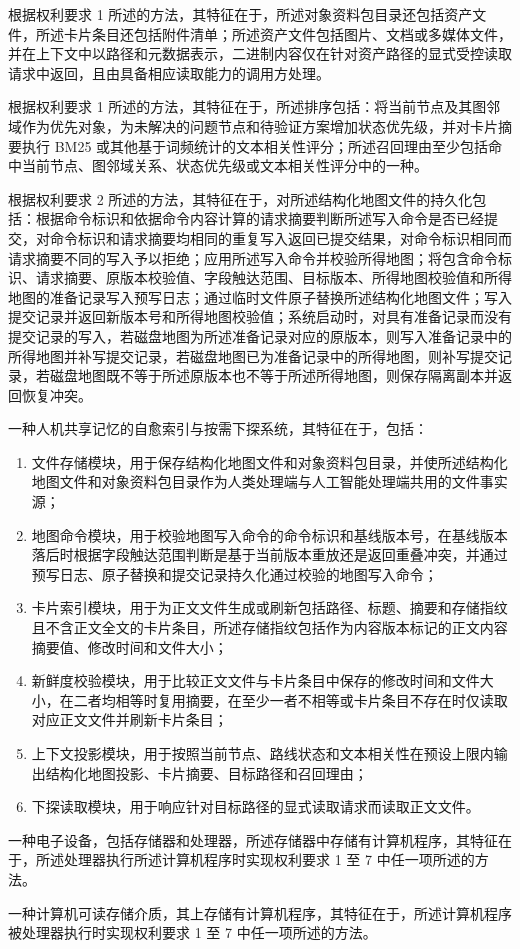 \begin{claimitem}
\item 根据权利要求 1 所述的方法，其特征在于，所述对象资料包目录还包括资产文件，所述卡片条目还包括附件清单；所述资产文件包括图片、文档或多媒体文件，并在上下文中以路径和元数据表示，二进制内容仅在针对资产路径的显式受控读取请求中返回，且由具备相应读取能力的调用方处理。

\item 根据权利要求 1 所述的方法，其特征在于，所述排序包括：将当前节点及其图邻域作为优先对象，为未解决的问题节点和待验证方案增加状态优先级，并对卡片摘要执行 BM25 或其他基于词频统计的文本相关性评分；所述召回理由至少包括命中当前节点、图邻域关系、状态优先级或文本相关性评分中的一种。

\item 根据权利要求 2 所述的方法，其特征在于，对所述结构化地图文件的持久化包括：根据命令标识和依据命令内容计算的请求摘要判断所述写入命令是否已经提交，对命令标识和请求摘要均相同的重复写入返回已提交结果，对命令标识相同而请求摘要不同的写入予以拒绝；应用所述写入命令并校验所得地图；将包含命令标识、请求摘要、原版本校验值、字段触达范围、目标版本、所得地图校验值和所得地图的准备记录写入预写日志；通过临时文件原子替换所述结构化地图文件；写入提交记录并返回新版本号和所得地图校验值；系统启动时，对具有准备记录而没有提交记录的写入，若磁盘地图为所述准备记录对应的原版本，则写入准备记录中的所得地图并补写提交记录，若磁盘地图已为准备记录中的所得地图，则补写提交记录，若磁盘地图既不等于所述原版本也不等于所述所得地图，则保存隔离副本并返回恢复冲突。

\item 一种人机共享记忆的自愈索引与按需下探系统，其特征在于，包括：
\begin{enumerate}[label=(\arabic*),leftmargin=2.6em,itemsep=0.65em,topsep=0.55em]
\item 文件存储模块，用于保存结构化地图文件和对象资料包目录，并使所述结构化地图文件和对象资料包目录作为人类处理端与人工智能处理端共用的文件事实源；
\item 地图命令模块，用于校验地图写入命令的命令标识和基线版本号，在基线版本落后时根据字段触达范围判断是基于当前版本重放还是返回重叠冲突，并通过预写日志、原子替换和提交记录持久化通过校验的地图写入命令；
\item 卡片索引模块，用于为正文文件生成或刷新包括路径、标题、摘要和存储指纹且不含正文全文的卡片条目，所述存储指纹包括作为内容版本标记的正文内容摘要值、修改时间和文件大小；
\item 新鲜度校验模块，用于比较正文文件与卡片条目中保存的修改时间和文件大小，在二者均相等时复用摘要，在至少一者不相等或卡片条目不存在时仅读取对应正文文件并刷新卡片条目；
\item 上下文投影模块，用于按照当前节点、路线状态和文本相关性在预设上限内输出结构化地图投影、卡片摘要、目标路径和召回理由；
\item 下探读取模块，用于响应针对目标路径的显式读取请求而读取正文文件。
\end{enumerate}

\item 一种电子设备，包括存储器和处理器，所述存储器中存储有计算机程序，其特征在于，所述处理器执行所述计算机程序时实现权利要求 1 至 7 中任一项所述的方法。

\item 一种计算机可读存储介质，其上存储有计算机程序，其特征在于，所述计算机程序被处理器执行时实现权利要求 1 至 7 中任一项所述的方法。
\end{claimitem}
